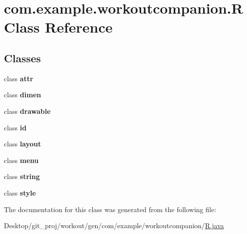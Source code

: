\hypertarget{classcom_1_1example_1_1workoutcompanion_1_1_r}{\section{com.\-example.\-workoutcompanion.\-R Class Reference}
\label{classcom_1_1example_1_1workoutcompanion_1_1_r}
}
\subsection*{Classes}
\begin{DoxyCompactItemize}
\item 
class {\bfseries attr}
\item 
class {\bfseries dimen}
\item 
class {\bfseries drawable}
\item 
class {\bfseries id}
\item 
class {\bfseries layout}
\item 
class {\bfseries menu}
\item 
class {\bfseries string}
\item 
class {\bfseries style}
\end{DoxyCompactItemize}


The documentation for this class was generated from the following file\-:\begin{DoxyCompactItemize}
\item 
Desktop/git\-\_\-proj/workout/gen/com/example/workoutcompanion/\hyperlink{_r_8java}{R.\-java}\end{DoxyCompactItemize}
